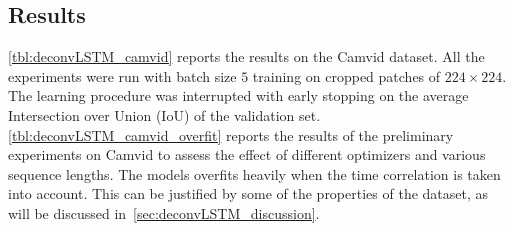 \subsection{Results}\label{sec:deconvLSTM_results}

\autoref{tbl:deconvLSTM_camvid} reports the results on the Camvid dataset. All
the experiments were run with batch size $5$ training on cropped patches of
$224 \times 224$. The learning procedure was interrupted with early stopping on
the average Intersection over Union (IoU) of the validation set.
\autoref{tbl:deconvLSTM_camvid_overfit} reports the results of the preliminary
experiments on Camvid to assess the effect of different optimizers and various
sequence lengths. The models overfits heavily when the time correlation is
taken into account. This can be justified by some of the properties of the
dataset, as will be discussed in~\autoref{sec:deconvLSTM_discussion}.

\begin{table}[t]
    \caption{Results on the CamVid dataset. Pixel accuracy and average
        Intersection over Union (IoU) are reported.}
    \label{tbl:deconvLSTM_camvid}
\end{table}

\begin{table}[t]
    \caption{Preliminary experiments on the effects of time correlation
        the CamVid dataset. Pixel accuracy and average Intersection over Union
        (IoU) are reported. The model seems to fail to generalize properly.}
    \label{tbl:deconvLSTM_camvid_overfit}
\end{table}

